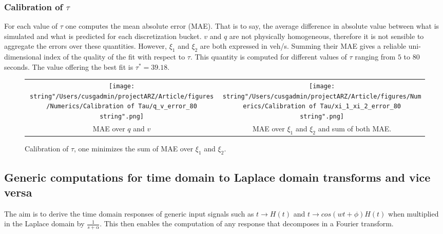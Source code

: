 \documentclass[preprint]{elsarticle}
\begin{document}
\subsubsection{Calibration of $\tau$\label{sub:Calibration-of-tau}}

For each value of $\tau$ one computes the mean absolute error (MAE).
That is to say, the average difference in absolute value between what
is simulated and what is predicted for each discretization bucket.
$v$ and $q$ are not physically homogeneous, therefore it is not
sensible to aggregate the errors over these quantities. However, $\xi_{1}$
and $\xi_{2}$ are both expressed in veh/s. Summing their MAE gives
a reliable uni-dimensional index of the quality of the fit with respect
to $\tau$. This quantity is computed for different values of $\tau$
ranging from $5$ to $80$ seconds. The value offering the best fit
is $\tau^{*}=39.18$.

\begin{figure}
\begin{centering}
\begin{tabular}{cc}
\texttt{[image: \\string"/Users/cusgadmin/projectARZ/Article/figures/Numerics/Calibration of Tau/q\_v\_error\_80\\string".png]} & \texttt{[image: \\string"/Users/cusgadmin/projectARZ/Article/figures/Numerics/Calibration of Tau/xi\_1\_xi\_2\_error\_80\\string".png]}\tabularnewline
MAE over $q$ and $v$ & MAE over $\xi_{1}$ and $\xi_{2}$ and sum of both MAE.\tabularnewline
\end{tabular}
\par\end{centering}

\protect\caption{Calibration of $\tau$, one minimizes the sum of MAE over $\xi_{1}$
and $\xi_{2}$.}
\end{figure}


\subsection{Generic computations for time domain to Laplace domain transforms
and vice versa\label{sub:Generic-computations}}

The aim is to derive the time domain responses of generic input signals
such as $t\rightarrow H\left(t\right)$ and $t\rightarrow cos\left(wt+\phi\right)H\left(t\right)$
when multiplied in the Laplace domain by $\frac{1}{s+\alpha}$. This
then enables the computation of any response that decomposes in a
Fourier transform.
\end{document}
